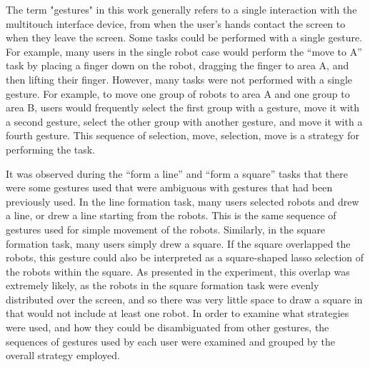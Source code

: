 The term "gestures" in this work generally refers to a single interaction with the multitouch interface device, from when the user's hands contact the screen to when they leave the screen. 
Some tasks could be performed with a single gesture. 
For example, many users in the single robot case would perform the ``move to A'' task by placing a finger down on the robot, dragging the finger to area A, and then lifting their finger. 
However, many tasks were not performed with a single gesture. 
For example, to move one group of robots to area A and one group to area B, users would frequently select the first group with a gesture, move it with a second gesture, select the other group with another gesture, and move it with a fourth gesture. 
This sequence of selection, move, selection, move is a strategy for performing the task. 

It was observed during the ``form a line'' and ``form a square'' tasks that there were some gestures used that were ambiguous with gestures that had been previously used. 
In the line formation task, many users selected robots and drew a line, or drew a line starting from the robots. 
This is the same sequence of gestures used for simple movement of the robots.
Similarly, in the square formation task, many users simply drew a square. 
If the square overlapped the robots, this gesture could also be interpreted as a square-shaped lasso selection of the robots within the square. 
As presented in the experiment, this overlap was extremely likely, as the robots in the square formation task were evenly distributed over the screen, and so there was very little space to draw a square in that would not include at least one robot. 
In order to examine what strategies were used, and how they could be disambiguated from other gestures, the sequences of gestures used by each user were examined and grouped by the overall strategy employed. 

